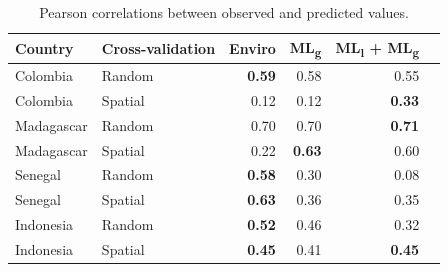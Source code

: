 \documentclass[11pt]{article}
\begin{document}
\begin{table}[t!]
\caption{Pearson correlations between observed and predicted values. }
\centering
\begin{tabular}{llrrrr}
Country &  Cross-validation & Enviro &   ML\textsubscript{g} & ML\textsubscript{l} + ML\textsubscript{g} \\
\hline 
 Colombia & Random &  \textbf{0.59} &0.58 & 0.55 \\
 Colombia &  Spatial &  0.12 &  0.12 & \textbf{0.33}\\
 Madagascar &  Random &  0.70 &  0.70 & \textbf{0.71} \\
 Madagascar &  Spatial &  0.22 &  \textbf{0.63} & 0.60\\
 Senegal &  Random &  \textbf{0.58} &  0.30 & 0.08 \\
 Senegal &  Spatial &  \textbf{0.63} & 0.36 & 0.35 \\
 Indonesia &  Random &  \textbf{0.52} & 0.46 & 0.32 \\
 Indonesia &  Spatial &  \textbf{0.45} & 0.41 & \textbf{0.45} \\
\end{tabular}
\label{t:results2}
\end{table}


\end{document}
